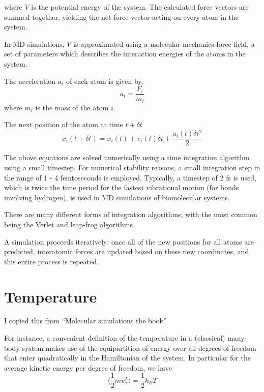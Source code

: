 where $V$ is the potential energy of the system. The calculated force vectors are summed together, yielding the net force vector acting on every atom in the system. 

In MD simulations, $V$ is approximated using a molecular mechanics force field, a set of parameters which describes the interaction energies of the atoms in the system.

The acceleration $a_i$ of each atom is given by,
\begin{equation}
a_i = \frac{F_i}{m_i}
\end{equation}
where $m_i$ is the mass of the atom $i$.

The next position of the atom at time $ t + \delta t$
\begin{equation}
x_i(t + \delta t) = x_i(t) + v_i(t)\delta t + \frac{a_i(t)\delta t^2}{2}	
\end{equation}

The above equations are solved numerically using a time integration algorithm using a small timestep. For numerical stability reasons, a small integration step in the range of 1 - 4 femtoseconds is employed. Typically, a timestep of 2 fs is used, which is twice the time period for the fastest vibrational motion (for bonds involving hydrogen), is used in MD simulations of biomolecular systems. %

There are many different forms of integration algorithms, with the most common being the Verlet and leap-frog algorithms. 

A simulation proceeds iteratively: once all of the new positions for all atoms are predicted, interatomic forces are updated based on these new coordinates, and this entire process is repeated.

\section{Temperature}
I copied this from ``Molecular simulations the book''

For instance, a convenient definition of the temperature in a (classical) many-body system makes use of the equipartition of energy over all degrees of freedom that enter quadratically in the Hamiltonian of the system. In particular for the average kinetic energy per degree of freedom, we have
\begin{equation}
  \langle \frac{1}{2} mv_{\alpha}^2 \rangle =   \frac{1}{2} k_BT
\end{equation}

